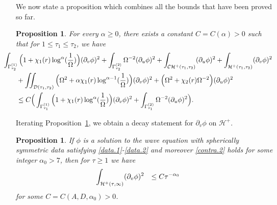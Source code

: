 \documentclass[12 pt, reqno]{amsart}
\newtheorem{proposition}[theorem]{Proposition}
\theoremstyle{definition}
\theoremstyle{remark}
\numberwithin{equation}{section}
\newcommand{\rd}{\partial}
\newcommand{\bb}{\Big}
\newcommand{\0}{\emptyset}
\newcommand{\alp}{\alpha}
\newcommand{\Gmm}{\Gamma}
\newcommand{\Omg}{\Omega}
\newcommand{\calC}{\mathcal C}
\newcommand{\calD}{\mathcal D}
\newcommand{\calH}{\mathcal H}
\newcommand{\CH}{\calC \calH^{+}}		%
\newcommand{\EH}{\calH^{+}}
\begin{document}
We now state a proposition which combines all the bounds that have been proved so far.
\begin{proposition} \label{prop:intr:red-shift:final}
For every $\alp \geq 0$, there exists a constant $C = C(\alp) > 0$ such that for $1 \leq \tau_{1} \leq \tau_{2}$, we have
\begin{equation} \label{eq:intr:red-shift:final}
\begin{aligned}
& \hskip-2em
	\int_{\Gmm_{\tau_{2}}^{(1)}} \bb( 1 + \chi_{1}(r) \log^{\alp}(\frac{1}{\Omg}) \bb) (\rd_{v} \phi)^{2} + \int_{\Gmm_{\tau_{2}}^{(2)}} \Omg^{-2} (\rd_{u} \phi)^{2} 
	 + \int_{\CH(\tau_{1}, \tau_{2})}  (\rd_{u} \phi)^{2} + \int_{\EH(\tau_{1}, \tau_{2})} (\rd_{v} \phi)^{2}  \\
	&	+ \iint_{\calD(\tau_{1}, \tau_{2})}  \bb( \Omg^{2} + \alp \chi_{1}(r) \log^{\alp-1}(\frac{1}{\Omg}) \bb) (\rd_{v} \phi)^{2}  
		+	\bb( \Omg^{2} + \chi_{2}(r) \Omg^{-2} \bb) (\rd_{u} \phi)^{2}  \\
	& \leq C \bb( \int_{\Gmm^{(1)}_{\tau_{1}}} \bb( 1 + \chi_{1}(r) \log^{\alp}(\frac{1}{\Omg}) \bb) (\rd_{v} \phi)^{2}
				+ \int_{\Gmm^{(2)}_{\tau_{1}}} \Omg^{-2} (\rd_{u} \phi)^{2} \bb).
\end{aligned}
\end{equation}
\end{proposition}

Iterating Proposition~\ref{prop:intr:red-shift:final}, we obtain a decay statement for $\rd_{v} \phi$ on $\EH$.
\begin{proposition} \label{prop:intr:decay}
If $\phi$ is a solution to the wave equation with spherically symmetric data satisfying \eqref{data.1}-\eqref{data.2} and moreover \eqref{contra.2} holds for some integer $\alp_0> 7$, then for $\tau \geq 1$ we have
\begin{equation} \label{eq:intr:decay}
\begin{aligned}
& \hskip-2em
	\int_{\EH(\tau, \infty)} (\rd_{v} \phi)^{2} 
	& \leq C \tau^{- \alp_{0}}
\end{aligned}
\end{equation}
for some $C=C(A,D,\alp_0)>0$.
\end{proposition}
\end{document}
